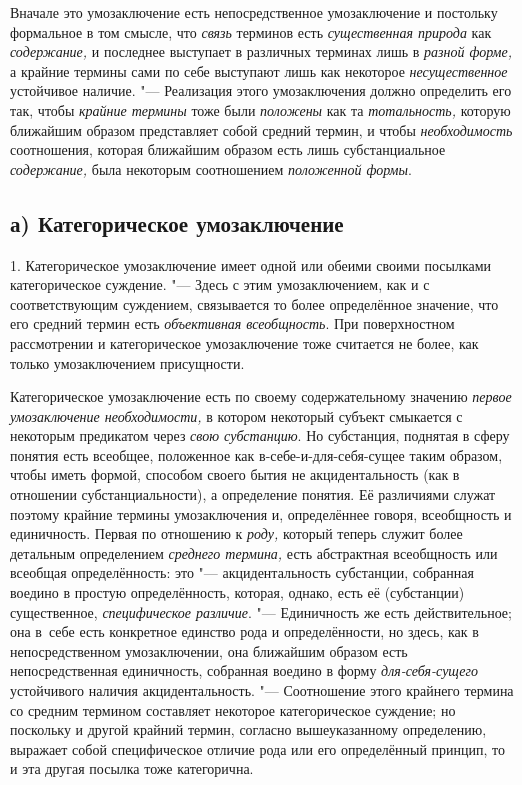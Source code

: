 Вначале это умозаключение есть непосредственное умозаключение
и постольку формальное в том смысле, что
{\em связь} терминов есть
{\em существенная природа}
как {\em содержание,}
и последнее выступает в различных терминах лишь в
{\em разной форме,} а
крайние термины сами по себе выступают лишь как некоторое
{\em несущественное}
устойчивое наличие. "--- Реализация этого
умозаключения должно определить его так, чтобы
{\em крайние термины
}тоже были
{\em положены} как та
{\em тотальность,}
которую ближайшим образом представляет собой средний термин,
и чтобы {\em необходимость}
соотношения, которая ближайшим образом есть лишь
субстанциальное {\em содержание,}
была некоторым соотношением
{\em положенной формы}.

\subsection[а) Категорическое умозаключение]{а) Категорическое умозаключение}

1. Категорическое умозаключение имеет одной или обеими своими
посылками категорическое
суждение.
"--- Здесь с этим умозаключением, как и с соответствующим
суждением, связывается то более определённое значение, что
его средний термин есть {\em объективная
всеобщность}. При поверхностном рассмотрении и
категорическое умозаключение тоже считается не более, как только
умозаключением присущности.

Категорическое умозаключение есть по своему содержательному
значению {\em первое умозаключение
необходимости,} в котором некоторый субъект смыкается с
некоторым предикатом через {\em свою
субстанцию}. Но субстанция, поднятая в сферу понятия есть
всеобщее, положенное как в-себе-и-для-себя-сущее таким образом, чтобы иметь
формой, способом своего бытия не акцидентальность (как в отношении
субстанциальности), а определение понятия. Её различиями служат поэтому
крайние термины умозаключения и, определённее говоря, всеобщность и
единичность. Первая по отношению к
{\em роду,} который
теперь служит более детальным определением
{\em среднего термина,}
есть абстрактная всеобщность или всеобщая определённость:
это "--- акцидентальность субстанции, собранная воедино в
простую определённость, которая, однако, есть её (субстанции) существенное,
{\em специфическое различие}. "---
Единичность же есть действительное; она в~себе есть
конкретное единство рода и определённости, но здесь, как в непосредственном
умозаключении, она ближайшим образом есть непосредственная единичность,
собранная воедино в форму
{\em для-себя-сущего}
устойчивого наличия акцидентальность. "---
Соотношение этого крайнего термина со средним термином
составляет некоторое категорическое суждение; но поскольку и другой крайний
термин, согласно вышеуказанному определению, выражает собой специфическое
отличие рода или его определённый принцип, то и эта другая посылка тоже
категорична.

